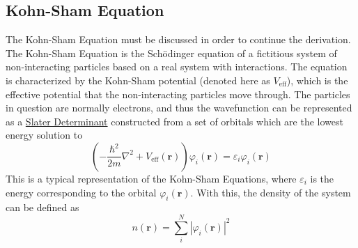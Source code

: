 \documentclass[12pt]{article}
\newcommand{\lrp}[1]{\left( #1 \right)}
\begin{document}
\subsection*{Kohn-Sham Equation} %
The Kohn-Sham Equation must be discussed in order to continue the derivation. The Kohn-Sham Equation is the Sch\"odinger equation of a fictitious system of non-interacting particles based on a real system with interactions. The equation is characterized by the Kohn-Sham potential (denoted here as $V_{\mathrm{eff}}$), which is the effective potential that the non-interacting particles move through. The particles in question are normally electrons, and thus the wavefunction can be represented as a \href{https://en.wikipedia.org/wiki/Slater_determinant}{Slater Determinant} constructed from a set of orbitals which are the lowest energy solution to 
\begin{equation}\label{eq:KSeq}
    \lrp{-\frac{\hbar^2}{2m}\nabla^2+ V_{\mathrm{eff}}(\textbf{r})}\varphi_i(\textbf{r}) = \varepsilon_i\varphi_i(\textbf{r})
\end{equation}
This is a typical representation of the Kohn-Sham Equations, where $\varepsilon_i$ is the energy corresponding to the orbital $\varphi_i(\textbf{r})$. With this, the density of the system can be defined as 
\begin{equation*}
    n(\textbf{r}) = \sum_i^N |\varphi_i(\textbf{r})|^2
\end{equation*}
\end{document}

